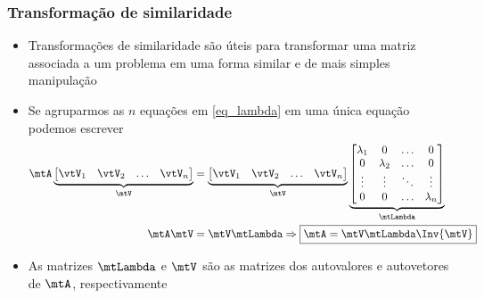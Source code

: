 \begin{frame}
  \frametitle{Transformação de similaridade}
  \begin{itemize}
    \item Transformações de similaridade são úteis para transformar uma matriz associada a um problema em uma forma similar e de mais simples manipulação
    \item Se agruparmos as $n$ equações em \eqref{eq_lambda} em uma única equação podemos escrever
    \begin{equation}\label{eq_mat_auto}
      \begin{split}
        \mtA \underbrace{\left[\begin{matrix} \vtV_1 & \vtV_2 & \ldots & \vtV_n\end{matrix}\right]}_{\mtV} &=
        \underbrace{ \left[\begin{matrix} \vtV_1 & \vtV_2 & \ldots & \vtV_n\end{matrix}\right] }_{\mtV} \underbrace{\left[\begin{matrix}
          \lambda_1 & 0 & \ldots & 0 \\
          0 & \lambda_2 & \ldots & 0 \\
          \vdots & \vdots & \ddots & \vdots \\
          0 & 0 & \ldots & \lambda_n \\
        \end{matrix}\right]}_{\mtLambda} \\
        \mtA\mtV &= \mtV\mtLambda \Rightarrow \boxed{\mtA = \mtV\mtLambda\Inv{\mtV}}
      \end{split}
    \end{equation}
    \item As matrizes $\mtLambda$ e $\mtV$ são as matrizes dos autovalores e autovetores de $\mtA$, respectivamente
  \end{itemize}
\end{frame}

